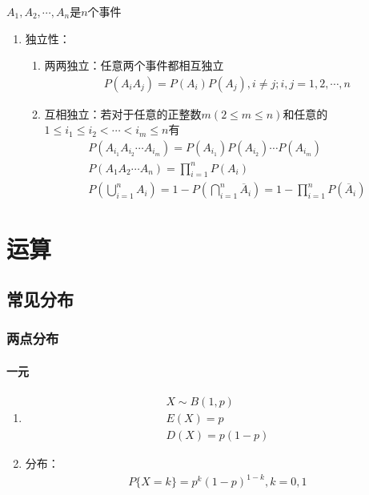 \documentclass[12pt]{book}
\begin{document}
$A_1,A_2,\cdots,A_n$是$n$个事件

\begin{enumerate}
    \item 独立性：
          \begin{enumerate}
            \item 两两独立：任意两个事件都相互独立
            \begin{gather*}
                P(A_i A_j) = P(A_i) P(A_j), i\neq j;i,j=1,2,\cdots,n
            \end{gather*}
              \item 互相独立：若对于任意的正整数$m(2\leqslant m\leqslant n)$和任意的$1\leqslant i_{1}\leqslant i_{2}< \cdots < i_{m}\leqslant n $有
                    \begin{gather*}
                        P(A_{i_{1}}A_{i_{2}}\cdots A_{i_{m}}) = P(A_{i_{1}}) P(A_{i_{2}}) \cdots P(A_{i_{m}}) \\
                        P(A_1 A_2 \cdots A_n) = \prod_{i=1}^{n}{ P(A_i) } \\
                        P(\bigcup_{i=1}^{n}{A_i}) = 1-P(\bigcap_{i=1}^{n}{\overline{A}_i}) = 1- \prod_{i=1}^{n}{P(\overline{A}_i)}
                    \end{gather*}
          \end{enumerate}
\end{enumerate}




\section{运算}


\subsection{常见分布}



\subsubsection{两点分布}



\paragraph{一元}

\begin{enumerate}[1.]
    \item
          \begin{gather*}
              X\sim B(1,p) \\
              E(X) = p \\
              D(X) = p(1-p)
          \end{gather*}
    \item 分布：
          \begin{gather*}
              P\{X=k\} = p^{k} (1-p)^{1-k}, k=0,1
          \end{gather*}
\end{enumerate}
\end{document}
